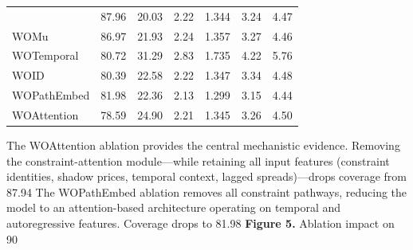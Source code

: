 {\begin{table}[t]
{\begin{tabular}{lllllll}
{WOEnergyCancel & 87.96 & 20.03 & 2.22 & 1.344 & 3.24 & 4.47 \\
WOMu & 86.97 & 21.93 & 2.24 & 1.357 & 3.27 & 4.46 \\
WOTemporal & 80.72 & 31.29 & 2.83 & 1.735 & 4.22 & 5.76 \\
WOID & 80.39 & 22.58 & 2.22 & 1.347 & 3.34 & 4.48 \\
WOPathEmbed & 81.98 & 22.36 & 2.13 & 1.299 & 3.15 & 4.44 \\
WOAttention & 78.59 & 24.90 & 2.21 & 1.345 & 3.26 & 4.50 \\
\bottomrule
\end{tabular}
}
\end{table}
The WOAttention ablation provides the central mechanistic evidence. Removing the constraint-attention module---while retaining all input features (constraint identities, shadow prices, temporal context, lagged spreads)---drops coverage from 87.94%
The WOPathEmbed ablation removes all constraint pathways, reducing the model to an attention-based architecture operating on temporal and autoregressive features. Coverage drops to 81.98%
\textbf{Figure 5.} Ablation impact on 90%
}
